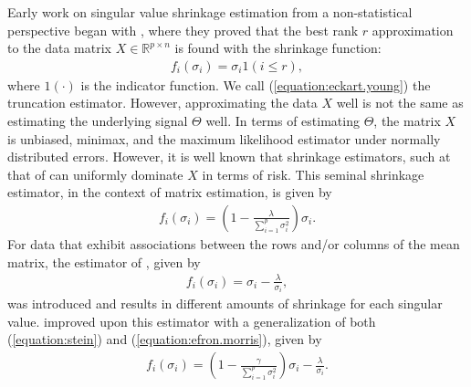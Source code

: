  Early work on singular value shrinkage estimation from a
 non-statistical perspective began with
 \cite{eckart1936approximation}, where they proved that the best rank
 $r$ approximation to the data matrix $X \in \mathbb{R}^{p \times n}$
 is found with the shrinkage function:
  \begin{align}
    \label{equation:eckart.young}
    f_i(\sigma_i) = \sigma_i 1(i \leq r),
  \end{align}
  where $1(\cdot)$ is the indicator function. We call (\ref{equation:eckart.young}) the truncation estimator. However, approximating
  the data $X$ well is not the same as estimating the underlying
  signal $\Theta$ well. In terms of estimating $\Theta$, the matrix $X$ is unbiased, minimax, and the maximum likelihood estimator under normally distributed errors. However, it is well known that shrinkage estimators, such at that of \cite{stein1981estimation} can uniformly dominate $X$ in terms of risk. This
  seminal shrinkage estimator, in the context of matrix estimation, is given by
  \begin{align}
    \label{equation:stein}
    f_i(\sigma_i) = \left(1 - \frac{\lambda}{\sum_{i = 1}^p\sigma_i^2}\right)\sigma_i.
  \end{align}
  For data that exhibit associations between the rows and/or columns of the mean matrix, the estimator of \cite{efron1972empirical}, given by
  \begin{align}
    \label{equation:efron.morris}
    f_i(\sigma_i) = \sigma_i - \frac{\lambda}{\sigma_i},
  \end{align}
 was introduced and results in different amounts of shrinkage for each singular value.
\cite{efron1976multivariate} improved upon this estimator with a generalization of both (\ref{equation:stein}) and (\ref{equation:efron.morris}), given by
\begin{align}
  \label{equation:improved.em}
  f_i(\sigma_i) = \left(1 - \frac{\gamma}{\sum_{i = 1}^p\sigma_i^2}\right)\sigma_i - \frac{\lambda}{\sigma_i}.
\end{align}

